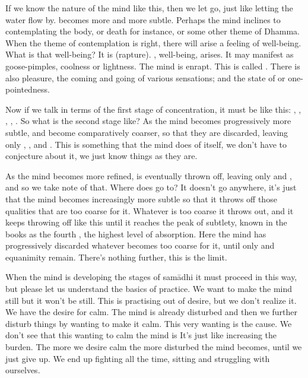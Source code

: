 If we know the nature of the mind like this, then we let go, just like letting the water flow by.  becomes more and more subtle. Perhaps the mind inclines to contemplating the body, or death for instance, or some other theme of Dhamma. When the theme of contemplation is right, there will arise a feeling of well-being. What is that well-being? It is  (rapture). , well-being, arises. It may manifest as goose-pimples, coolness or lightness. The mind is enrapt. This is called . There is also pleasure,  the coming and going of various sensations; and the state of  or one-pointedness.

Now if we talk in terms of the first stage of concentration, it must be like this: , , , , . So what is the second stage like? As the mind becomes progressively more subtle,  and  become comparatively coarser, so that they are discarded, leaving only , , and . This is something that the mind does of itself, we don't have to conjecture about it, we just know things as they are.

As the mind becomes more refined,  is eventually thrown off, leaving only  and , and so we take note of that. Where does  go to? It doesn't go anywhere, it's just that the mind becomes increasingly more subtle so that it throws off those qualities that are too coarse for it. Whatever is too coarse it throws out, and it keeps throwing off like this until it reaches the peak of subtlety, known in the books as the fourth , the highest level of absorption. Here the mind has progressively discarded whatever becomes too coarse for it, until only  and  equanimity remain. There's nothing further, this is the limit.

When the mind is developing the stages of sam\=adhi it must proceed in this way, but please let us understand the basics of practice. We want to make the mind still but it won't be still. This is practising out of desire, but we don't realize it. We have the desire for calm. The mind is already disturbed and then we further disturb things by wanting to make it calm. This very wanting is the cause. We don't see that this wanting to calm the mind is  It's just like increasing the burden. The more we desire calm the more disturbed the mind becomes, until we just give up. We end up fighting all the time, sitting and struggling with ourselves.

